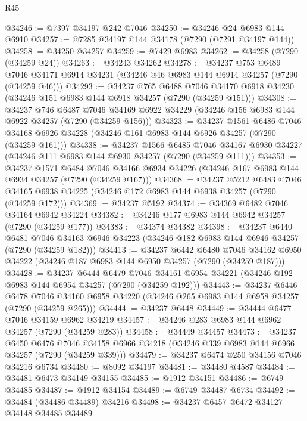 \begin{lexlean}{R45}
\begin{coremodule}
{@34246 := @7397 @34197 @242 @7046
@34250 := @34246 @24 @6983 @144 @6910
@34257 := @7285 @34197 @144 @34178 (@7290 (@7291 @34197 @144))
@34258 := @34250 @34257
@34259 := @7429 @6983
@34262 := @34258 (@7290 (@34259 @24))
@34263 := @34243 @34262
@34278 := @34237
    @753
    @6489
    @7046
    @34171
    @6914
    @34231
    (@34246 @46 @6983 @144 @6914 @34257 (@7290 (@34259 @46)))
@34293 := @34237
    @765
    @6488
    @7046
    @34170
    @6918
    @34230
    (@34246 @151 @6983 @144 @6918 @34257 (@7290 (@34259 @151)))
@34308 := @34237
    @746
    @6487
    @7046
    @34169
    @6922
    @34229
    (@34246 @156 @6983 @144 @6922 @34257 (@7290 (@34259 @156)))
@34323 := @34237
    @1561
    @6486
    @7046
    @34168
    @6926
    @34228
    (@34246 @161 @6983 @144 @6926 @34257 (@7290 (@34259 @161)))
@34338 := @34237
    @1566
    @6485
    @7046
    @34167
    @6930
    @34227
    (@34246 @111 @6983 @144 @6930 @34257 (@7290 (@34259 @111)))
@34353 := @34237
    @1571
    @6484
    @7046
    @34166
    @6934
    @34226
    (@34246 @167 @6983 @144 @6934 @34257 (@7290 (@34259 @167)))
@34368 := @34237
    @5212
    @6483
    @7046
    @34165
    @6938
    @34225
    (@34246 @172 @6983 @144 @6938 @34257 (@7290 (@34259 @172)))
@34369 := @34237 @5192
@34374 := @34369 @6482 @7046 @34164 @6942 @34224
@34382 := @34246 @177 @6983 @144 @6942 @34257 (@7290 (@34259 @177))
@34383 := @34374 @34382
@34398 := @34237
    @6440
    @6481
    @7046
    @34163
    @6946
    @34223
    (@34246 @182 @6983 @144 @6946 @34257 (@7290 (@34259 @182)))
@34413 := @34237
    @6442
    @6480
    @7046
    @34162
    @6950
    @34222
    (@34246 @187 @6983 @144 @6950 @34257 (@7290 (@34259 @187)))
@34428 := @34237
    @6444
    @6479
    @7046
    @34161
    @6954
    @34221
    (@34246 @192 @6983 @144 @6954 @34257 (@7290 (@34259 @192)))
@34443 := @34237
    @6446
    @6478
    @7046
    @34160
    @6958
    @34220
    (@34246 @265 @6983 @144 @6958 @34257 (@7290 (@34259 @265)))
@34444 := @34237 @6448
@34449 := @34444 @6477 @7046 @34159 @6962 @34219
@34457 := @34246 @283 @6983 @144 @6962 @34257 (@7290 (@34259 @283))
@34458 := @34449 @34457
@34473 := @34237
    @6450
    @6476
    @7046
    @34158
    @6966
    @34218
    (@34246 @339 @6983 @144 @6966 @34257 (@7290 (@34259 @339)))
@34479 := @34237 @6474 @250 @34156 @7046 @34216 @6734
@34480 := @8092 @34197
@34481 := @34480 @4587
@34484 := @34481 @6473 @34149 @34155
@34485 := @1912 @34151
@34486 := @6749 @34485
@34487 := @1912 @34154
@34489 := @6749 @34487 @6734
@34492 := @34484 (@34486 @34489) @34216
@34498 := @34237 @6457 @6472 @34127 @34148 @34485 @34489
}
\end{coremodule}
\end{lexlean}
